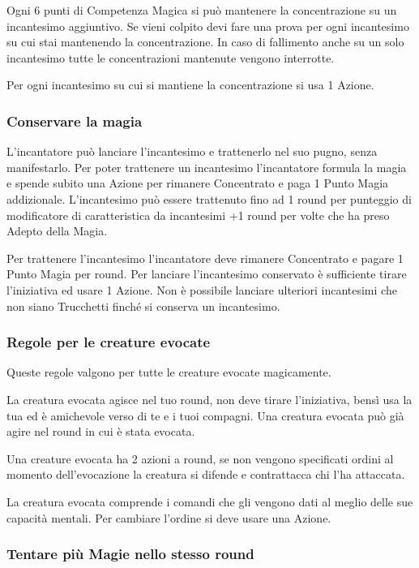 \begin{multicols}{2}
Ogni 6 punti di Competenza Magica si può mantenere la concentrazione su un incantesimo aggiuntivo. Se vieni colpito devi fare una prova per ogni incantesimo su cui stai mantenendo la concentrazione. In caso di fallimento anche su un solo incantesimo tutte le concentrazioni mantenute vengono interrotte.

Per ogni incantesimo su cui si mantiene la concentrazione si usa 1 Azione.

\subsubsection{Conservare la magia}\label{magieconservare}

L'incantatore può lanciare l'incantesimo e trattenerlo nel suo pugno, senza manifestarlo. Per poter trattenere un incantesimo l'incantatore formula la magia e spende subito una Azione per rimanere Concentrato e paga 1 Punto Magia addizionale.
L'incantesimo può essere trattenuto fino ad 1 round per punteggio di modificatore di caratteristica da incantesimi +1 round per volte che ha preso Adepto della Magia.

Per trattenere l'incantesimo l'incantatore deve rimanere Concentrato e pagare 1 Punto Magia per round.
Per lanciare l'incantesimo conservato è sufficiente tirare l'iniziativa ed usare 1 Azione. Non è possibile lanciare ulteriori incantesimi che non siano Trucchetti finché si conserva un incantesimo.

\subsubsection{Regole per le creature evocate}

Queste regole valgono per tutte le creature evocate magicamente.

La creatura evocata agisce nel tuo round, non deve tirare l'iniziativa, bensì usa la tua ed è amichevole verso di te e i tuoi compagni. Una creatura evocata può già agire nel round in cui è stata evocata.

Una creature evocata ha 2 azioni a round, se non vengono specificati ordini al momento dell'evocazione la creatura si difende e contrattacca chi l'ha attaccata.

La creatura evocata comprende i comandi che gli vengono dati al meglio delle sue capacità mentali. Per cambiare l'ordine si deve usare una Azione.

\subsubsection{Tentare più Magie nello stesso round}\hypertarget{piumagieround}{}\label{piumagieround}


\end{multicols}

